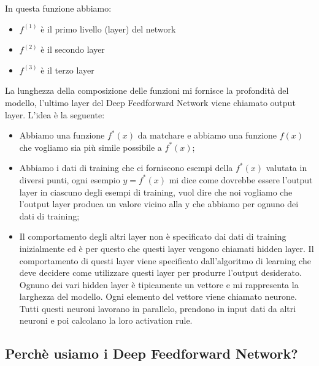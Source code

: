 \documentclass[14pt]{extreport}
\begin{document}
In questa funzione abbiamo:
\begin{itemize}
	\item $f^(1)$ è il primo livello (layer) del network
	\item $f^(2)$ è il secondo layer
	\item $f^(3)$ è il terzo layer
\end{itemize}

La lunghezza della composizione delle funzioni mi fornisce la profondità del modello, l'ultimo layer del Deep Feedforward Network viene chiamato
output layer. L'idea è la seguente:
\begin{itemize}
	\item Abbiamo una funzione $f^*(x)$ da matchare e abbiamo una funzione $f(x)$ che vogliamo sia più simile possibile a $f^*(x)$;
	\item Abbiamo i dati di training che ci forniscono esempi della $f^*(x)$ valutata in diversi punti, ogni esempio $y = f^*(x)$ mi dice come
	      dovrebbe essere l'output layer in ciascuno degli esempi di training, vuol dire che noi vogliamo che l'output layer produca un valore vicino
	      alla y che abbiamo per ognuno dei dati di training;
	\item Il comportamento degli altri layer non è specificato dai dati di training inizialmente ed è per questo che questi layer vengono chiamati
	      hidden layer. Il comportamento di questi layer viene specificato dall'algoritmo di learning che deve decidere come utilizzare questi layer
	      per produrre l'output desiderato. Ognuno dei vari hidden layer è tipicamente un vettore e mi rappresenta la larghezza del modello. Ogni
	      elemento del vettore viene chiamato neurone. Tutti questi neuroni lavorano in parallelo, prendono in input dati da altri neuroni e poi
	      calcolano la loro activation rule.
\end{itemize}


\subsection{Perchè usiamo i Deep Feedforward Network?}
\end{document}
